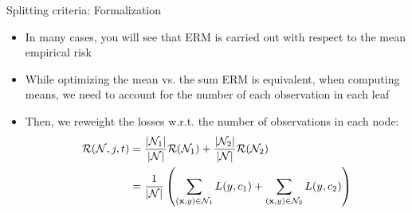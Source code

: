 \documentclass[11pt,compress,t,notes=noshow, xcolor=table]{beamer}
\begin{document}
\begin{vbframe}{Splitting criteria: Formalization}
\framebreak
\begin{itemize}

\item In many cases, you will see that ERM is carried out with respect to the mean empirical risk
\item While optimizing the mean vs. the sum ERM is equivalent, when computing means, we need to account for the number of each observation in each leaf
\item Then, we reweight the losses w.r.t. the number of observations in each node:
     \begin{align*}
      \mathcal{R}(\mathcal{N}, j, t) &= \frac{|\mathcal{N}_1|}{|\mathcal{N}|} \mathcal{R}(\mathcal{N}_1) + \frac{|\mathcal{N}_2|}{|\mathcal{N}|} \mathcal{R}(\mathcal{N}_2) \\
                  &= \frac{1}{|\mathcal{N}|}\left(\sum\limits_{(\mathbf{x},y) \in \mathcal{N}_1} L(y, c_1) + \sum\limits_{(\mathbf{x},y) \in \mathcal{N}_2} L(y, c_2)\right)
      \end{align*}

\end{itemize}
\end{vbframe}



\endlecture
\end{document}
